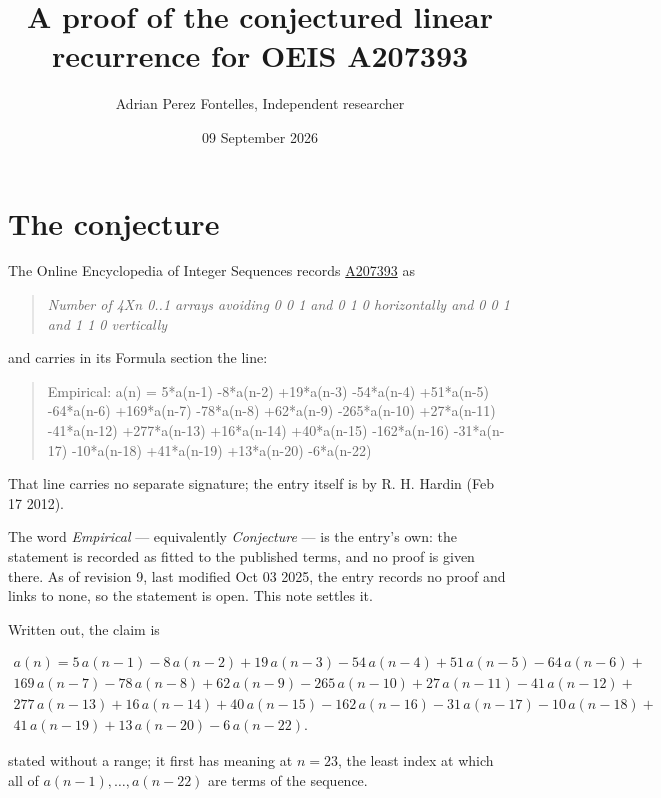 \documentclass[11pt]{article}
\title{A proof of the conjectured linear recurrence for OEIS A207393}
\author{Adrian Perez Fontelles, Independent researcher}
\date{09 September 2026}
\theoremstyle{definition}
\begin{document}
\maketitle
\section{The conjecture}

The Online Encyclopedia of Integer Sequences records \href{https://oeis.org/A207393}{A207393} as

\begin{quote}\itshape Number of 4Xn 0..1 arrays avoiding 0 0 1 and 0 1 0 horizontally and 0 0 1 and 1 1 0 vertically\end{quote}

and carries in its Formula section the line:

\begin{quote}\ttfamily Empirical: a(n) = 5*a(n-1) -8*a(n-2) +19*a(n-3) -54*a(n-4) +51*a(n-5) -64*a(n-6) +169*a(n-7) -78*a(n-8) +62*a(n-9) -265*a(n-10) +27*a(n-11) -41*a(n-12) +277*a(n-13) +16*a(n-14) +40*a(n-15) -162*a(n-16) -31*a(n-17) -10*a(n-18) +41*a(n-19) +13*a(n-20) -6*a(n-22)\end{quote}

That line carries no separate signature; the entry itself is by R. H. Hardin (Feb 17 2012).

The word {\itshape Empirical} --- equivalently {\itshape Conjecture} --- is the entry's own: the statement is recorded as fitted to the published terms, and no proof is given there. As of revision 9, last modified Oct 03 2025, the entry records no proof and links to none, so the statement is open. This note settles it.

Written out, the claim is

\begin{multline*} a(n) = 5\,a(n-1) - 8\,a(n-2) + 19\,a(n-3) - 54\,a(n-4) + 51\,a(n-5) - 64\,a(n-6) + \\ 169\,a(n-7) - 78\,a(n-8) + 62\,a(n-9) - 265\,a(n-10) + 27\,a(n-11) - 41\,a(n-12) + \\ 277\,a(n-13) + 16\,a(n-14) + 40\,a(n-15) - 162\,a(n-16) - 31\,a(n-17) - 10\,a(n-18) + \\ 41\,a(n-19) + 13\,a(n-20) - 6\,a(n-22). \end{multline*}

stated without a range; it first has meaning at $n = 23$, the least index at which all of $a(n-1),\dots,a(n-22)$ are terms of the sequence.
\end{document}
